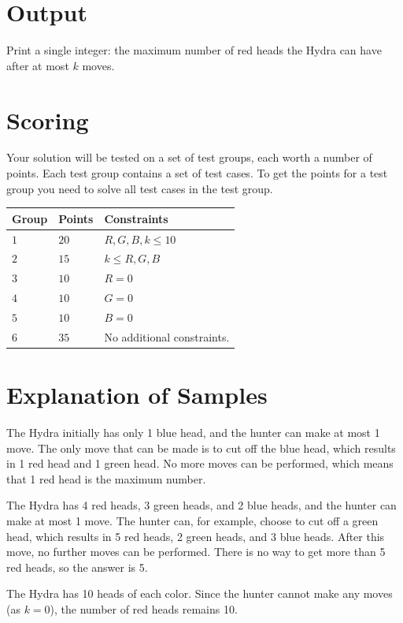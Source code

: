 \section*{Output}
Print a single integer: the maximum number of red heads the Hydra can have after at most $k$ moves.

\section*{Scoring}
Your solution will be tested on a set of test groups, each worth a number of points. Each test group contains
a set of test cases. To get the points for a test group you need to solve all test cases in the test group.

\begin{tabular}{| l | l | p{12cm} |}
  \hline
  \textbf{Group} & \textbf{Points} & \textbf{Constraints} \\ \hline
  $1$     & $20$     & $R, G, B, k \leq 10$ \\ \hline
  $2$     & $15$     & $k \leq R, G, B$ \\ \hline
  $3$     & $10$     & $R = 0$ \\ \hline
  $4$     & $10$     & $G = 0$ \\ \hline
  $5$     & $10$     & $B = 0$ \\ \hline
  $6$     & $35$     & No additional constraints. \\ \hline
\end{tabular}

\section*{Explanation of Samples}  
The Hydra initially has only 1 blue head, and the hunter can make at most 1 move. 
The only move that can be made is to cut off the blue head, which results in 1 red head and 1 green head. 
No more moves can be performed, which means that 1 red head is the maximum number.


The Hydra has 4 red heads, 3 green heads, and 2 blue heads, and the hunter can make at most 1 move. 
The hunter can, for example, choose to cut off a green head, which results in 5 red heads, 2 green heads,
and 3 blue heads. 
After this move, no further moves can be performed. There is no way to get more than 5 red heads, so the answer is 5.


The Hydra has 10 heads of each color. Since the hunter cannot make any moves (as $k = 0$), the number of red
heads remains 10.

